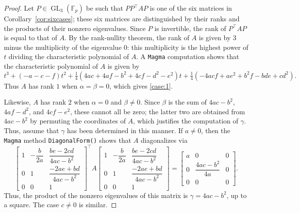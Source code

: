 \documentclass[10pt,a4paper]{amsart}
\numberwithin{equation}{section}
\numberwithin{figure}{section}
\numberwithin{table}{section}
\theoremstyle{definition}
\theoremstyle{plain}
\theoremstyle{remark}
\theoremstyle{plain}
\theoremstyle{definition}
\theoremstyle{plain}
\theoremstyle{plain}
\newcommand{\F}{\mathbb{F}}
\newcommand{\GL}{\operatorname{GL}}
\newcommand{\trsp}[1]{{{#1}^{\top}\!\!}}
\begin{document}
	\begin{proof}
		Let $P\in\GL_3(\F_p)$ be such that $P\trsp{P}AP$ is one of the six matrices in Corollary~\ref{cor:sixcases}; these six matrices are distinguished by their ranks and the products of their nonzero eigenvalues. Since $P$ is invertible, the rank of $\trsp{P}AP$ is equal to that of $A$. By the rank-nullity theorem, the rank of $A$ is given by 3 minus the multiplicity of the eigenvalue $0$: this multiplicity is the highest power of $t$ dividing the characteristic polynomial of $A$. A \texttt{Magma} computation shows that the characteristic polynomial of $A$ is given by
		\begin{equation*}
		t^3+(-a-c-f)t^2+\tfrac{1}{4}(4ac+4af-b^2+4cf-d^2-e^2)t+\tfrac{1}{4}(-4acf+ae^2+b^2f-bde+cd^2).
		\end{equation*}
		Thus $A$ has rank $1$ when $\alpha=\beta=0$, which gives \eqref{case:1}.
		
		Likewise, $A$ has rank $2$ when $\alpha=0$ and $\beta\ne 0$. Since $\beta$ is the sum of $4ac-b^2$, $4af-d^2$, and $4cf-e^2$, these cannot all be zero; the latter two are obtained from $4ac-b^2$ by permuting the coordinates of $A$, which justifies the computation of $\gamma$. Thus, assume that $\gamma$ has been determined in this manner. If $a\ne 0$, then the \texttt{Magma} method \texttt{DiagonalForm()} shows that $A$ diagonalizes via
		\begin{equation*}
		\begin{bmatrix}
		1 & -\dfrac{b}{2a} & \dfrac{be - 2cd}{4ac - b^2}\\
		0 & 1 & \dfrac{-2ae + bd}{4ac - b^2} \\
		0 & 0 & 1
		\end{bmatrix}^\top\!
		A
		\begin{bmatrix}
		1 & -\dfrac{b}{2a} & \dfrac{be - 2cd}{4ac - b^2}\\
		0 & 1 & \dfrac{-2ae + bd}{4ac - b^2} \\
		0 & 0 & 1
		\end{bmatrix}
		=
		\begin{bmatrix}
		a&0&0\\
		0&\dfrac{4ac-b^2}{4a}&0\\
		0&0&0
		\end{bmatrix}.
		\end{equation*}
		Thus, the product of the nonzero eigenvalues of this matrix is $\gamma=4ac-b^2$, up to a square. The case $c\ne 0$ is similar.
		

\end{proof}
\end{document}
